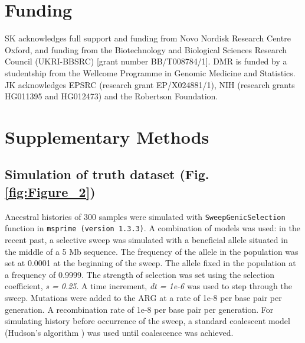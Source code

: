 \documentclass[unnumsec,webpdf,contemporary,large,namedate]{oup-authoring-template}%
\begin{document}

\section*{Funding}
SK acknowledges full support and funding from Novo Nordisk Research Centre Oxford,
and funding from the Biotechnology and Biological Sciences Research Council 
(UKRI-BBSRC) [grant number BB/T008784/1]. DMR is funded by 
a studentship from the Wellcome Programme in Genomic Medicine and Statistics.
JK acknowledges EPSRC (research grant EP/X024881/1),
NIH (research grants HG011395 and HG012473)
and the Robertson Foundation.




\clearpage \onecolumn \setcounter{figure}{0}
\renewcommand{\thefigure}{S\arabic{figure}}

\section{Supplementary Methods}
\subsection{Simulation of truth dataset (Fig. \ref{fig:Figure_2})}
\label{subsec:sweep_simulation}
Ancestral
histories of 300 samples were simulated with \texttt{SweepGenicSelection}
function in \texttt{msprime (version 1.3.3)}. A combination of models was used:
in the recent past, a selective sweep was simulated with a beneficial allele
situated in the middle of a 5 Mb sequence. The frequency of the allele in the
population was set at 0.0001 at the beginning of the sweep. The allele fixed in
the population at a frequency of 0.9999. The strength of selection was set
using the selection coefficient, \textit{s = 0.25}. A time increment,
\textit{dt = 1e-6} was used to step through the sweep. Mutations were added to
the ARG at a rate of 1e-8 per base pair per generation. A recombination rate of 1e-8 per base pair per generation. For simulating history before occurrence of the
sweep, a standard coalescent model (Hudson's algorithm \citep{Hudson1983}) was
used until coalescence was achieved.
\end{document}
